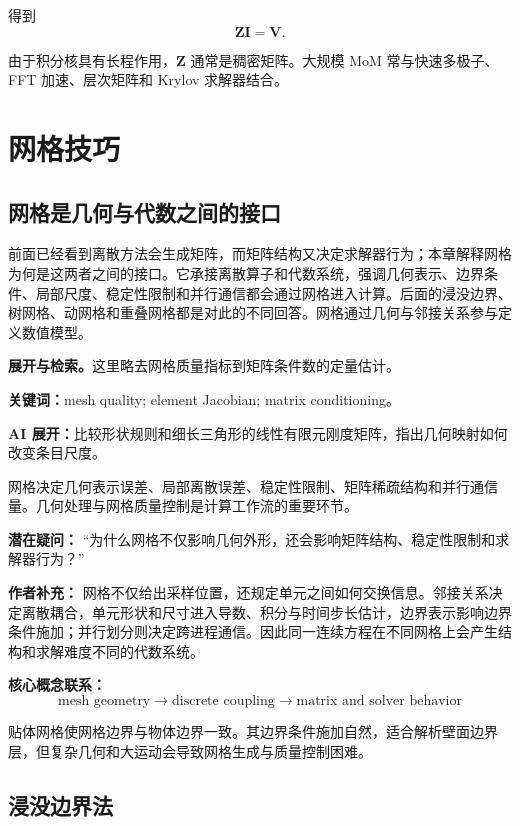 \documentclass[11pt,openany]{ctexbook}
\newcommand{\studyroute}[3]{%
  \par\smallskip\noindent\textbf{展开与检索。}#1\par
  \noindent\textbf{关键词：}#2。\par
  \noindent\textbf{AI 展开：}#3\par
}
\begin{document}
得到
\[
\bm Z\bm I=\bm V.
\]

由于积分核具有长程作用，\(\bm Z\) 通常是稠密矩阵。大规模 MoM 常与快速多极子、FFT 加速、层次矩阵和 Krylov 求解器结合。

\part{网格技巧}

\chapter{网格是几何与代数之间的接口}

\begin{chaptersummary}
前面已经看到离散方法会生成矩阵，而矩阵结构又决定求解器行为；本章解释网格为何是这两者之间的接口。它承接离散算子和代数系统，强调几何表示、边界条件、局部尺度、稳定性限制和并行通信都会通过网格进入计算。后面的浸没边界、树网格、动网格和重叠网格都是对此的不同回答。网格通过几何与邻接关系参与定义数值模型。
\end{chaptersummary}
\studyroute{这里略去网格质量指标到矩阵条件数的定量估计。}{mesh quality; element Jacobian; matrix conditioning}{比较形状规则和细长三角形的线性有限元刚度矩阵，指出几何映射如何改变条目尺度。}

网格决定几何表示误差、局部离散误差、稳定性限制、矩阵稀疏结构和并行通信量。几何处理与网格质量控制是计算工作流的重要环节。

\begin{authornote}
\textbf{潜在疑问：}
“为什么网格不仅影响几何外形，还会影响矩阵结构、稳定性限制和求解器行为？”

\textbf{作者补充：}
网格不仅给出采样位置，还规定单元之间如何交换信息。邻接关系决定离散耦合，单元形状和尺寸进入导数、积分与时间步长估计，边界表示影响边界条件施加；并行划分则决定跨进程通信。因此同一连续方程在不同网格上会产生结构和求解难度不同的代数系统。

\textbf{核心概念联系：}
\[
\text{mesh geometry}
\longrightarrow
\text{discrete coupling}
\longrightarrow
\text{matrix and solver behavior}
\]
\end{authornote}

贴体网格使网格边界与物体边界一致。其边界条件施加自然，适合解析壁面边界层，但复杂几何和大运动会导致网格生成与质量控制困难。

\chapter{浸没边界法}
\end{document}
